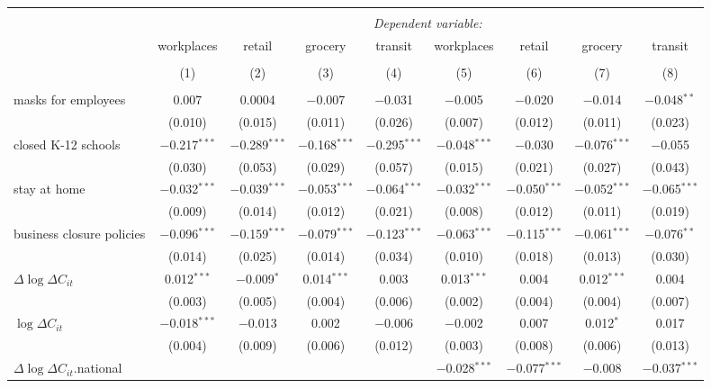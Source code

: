\begin{tabular}{@{\extracolsep{1pt}}lcccccccc} 
\\[-1.8ex]\hline 
\hline \\[-1.8ex] 
 & \multicolumn{8}{c}{\textit{Dependent variable:}} \\ 
\cline{2-9} 
 & workplaces & retail & grocery & transit & workplaces & retail & grocery & transit \\ 
\\[-1.8ex] & (1) & (2) & (3) & (4) & (5) & (6) & (7) & (8)\\ 
\hline \\[-1.8ex] 
 masks for employees & 0.007 & 0.0004 & $-$0.007 & $-$0.031 & $-$0.005 & $-$0.020 & $-$0.014 & $-$0.048$^{**}$ \\ 
  & (0.010) & (0.015) & (0.011) & (0.026) & (0.007) & (0.012) & (0.011) & (0.023) \\ 
  closed K-12 schools & $-$0.217$^{***}$ & $-$0.289$^{***}$ & $-$0.168$^{***}$ & $-$0.295$^{***}$ & $-$0.048$^{***}$ & $-$0.030 & $-$0.076$^{***}$ & $-$0.055 \\ 
  & (0.030) & (0.053) & (0.029) & (0.057) & (0.015) & (0.021) & (0.027) & (0.043) \\ 
  stay at home & $-$0.032$^{***}$ & $-$0.039$^{***}$ & $-$0.053$^{***}$ & $-$0.064$^{***}$ & $-$0.032$^{***}$ & $-$0.050$^{***}$ & $-$0.052$^{***}$ & $-$0.065$^{***}$ \\ 
  & (0.009) & (0.014) & (0.012) & (0.021) & (0.008) & (0.012) & (0.011) & (0.019) \\ 
  business closure policies & $-$0.096$^{***}$ & $-$0.159$^{***}$ & $-$0.079$^{***}$ & $-$0.123$^{***}$ & $-$0.063$^{***}$ & $-$0.115$^{***}$ & $-$0.061$^{***}$ & $-$0.076$^{**}$ \\ 
  & (0.014) & (0.025) & (0.014) & (0.034) & (0.010) & (0.018) & (0.013) & (0.030) \\ 
  $\Delta \log \Delta C_{it}$ & 0.012$^{***}$ & $-$0.009$^{*}$ & 0.014$^{***}$ & 0.003 & 0.013$^{***}$ & 0.004 & 0.012$^{***}$ & 0.004 \\ 
  & (0.003) & (0.005) & (0.004) & (0.006) & (0.002) & (0.004) & (0.004) & (0.007) \\ 
  $\log \Delta C_{it}$ & $-$0.018$^{***}$ & $-$0.013 & 0.002 & $-$0.006 & $-$0.002 & 0.007 & 0.012$^{*}$ & 0.017 \\ 
  & (0.004) & (0.009) & (0.006) & (0.012) & (0.003) & (0.008) & (0.006) & (0.013) \\ 
  $\Delta \log \Delta C_{it}$.national &  &  &  &  & $-$0.028$^{***}$ & $-$0.077$^{***}$ & $-$0.008 & $-$0.037$^{***}$ \\ 

\end{tabular}
